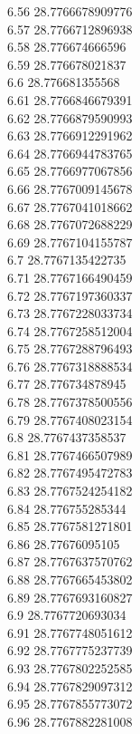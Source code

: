 {6.56	28.7766678909776\\
6.57	28.7766712896938\\
6.58	28.776674666596\\
6.59	28.776678021837\\
6.6	28.776681355568\\
6.61	28.7766846679391\\
6.62	28.7766879590993\\
6.63	28.7766912291962\\
6.64	28.7766944783765\\
6.65	28.7766977067856\\
6.66	28.7767009145678\\
6.67	28.7767041018662\\
6.68	28.7767072688229\\
6.69	28.7767104155787\\
6.7	28.7767135422735\\
6.71	28.7767166490459\\
6.72	28.7767197360337\\
6.73	28.7767228033734\\
6.74	28.7767258512004\\
6.75	28.7767288796493\\
6.76	28.7767318888534\\
6.77	28.776734878945\\
6.78	28.7767378500556\\
6.79	28.7767408023154\\
6.8	28.7767437358537\\
6.81	28.7767466507989\\
6.82	28.7767495472783\\
6.83	28.7767524254182\\
6.84	28.776755285344\\
6.85	28.7767581271801\\
6.86	28.77676095105\\
6.87	28.7767637570762\\
6.88	28.7767665453802\\
6.89	28.7767693160827\\
6.9	28.7767720693034\\
6.91	28.7767748051612\\
6.92	28.7767775237739\\
6.93	28.7767802252585\\
6.94	28.7767829097312\\
6.95	28.7767855773072\\
6.96	28.7767882281008\\
}
